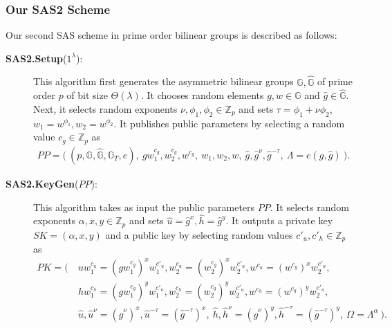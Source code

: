 \documentclass[11pt,letterpaper]{article}
\newcommand{\G}{\mathbb{G}}
\newcommand{\Z}{\mathbb{Z}}
\newcommand{\tb}[1]{\textbf{#1}}
\begin{document}
\subsubsection{Our SAS2 Scheme}

Our second SAS scheme in prime order bilinear groups is described as follows:

\begin{description}
\item [\tb{SAS2.Setup}($1^\lambda$):] This algorithm first generates the
    asymmetric bilinear groups $\G, \hat{\G}$ of prime order $p$ of bit
    size $\Theta(\lambda)$. It chooses random elements $g, w \in \G$ and
    $\hat{g} \in \hat{\G}$. Next, it selects random exponents $\nu, \phi_1,
    \phi_2 \in \Z_p$ and sets $\tau = \phi_1 + \nu \phi_2$, $w_1 =
    w^{\phi_1}, w_2 = w^{\phi_2}$. It publishes public parameters by
    selecting a random value $c_g \in \Z_p$ as
    \begin{align*}
    PP = \Big(~ (p, \G, \hat{\G}, \G_T, e),~
        g w_1^{c_g}, w_2^{c_g}, w^{c_g},~ w_1, w_2, w,~
        \hat{g}, \hat{g}^{\nu}, \hat{g}^{-\tau},~
        \Lambda = e(g, \hat{g})
    ~\Big).
    \end{align*}

\item [\tb{SAS2.KeyGen}($PP$):] This algorithm takes as input the public
    parameters $PP$. It selects random exponents $\alpha, x, y \in \Z_p$
    and sets $\hat{u} = \hat{g}^x, \hat{h} = \hat{g}^y$. It outputs a
    private key $SK = (\alpha, x, y)$ and a public key by selecting random
    values $c'_u, c'_h \in \Z_p$ as
    \begin{align*}
    PK = \Big(~
    &   u w_1^{c_u} = (g w_1^{c_g})^x w_1^{c'_u},
        w_2^{c_u}   = (w_2^{c_g})^x w_2^{c'_u},
        w^{c_u}     = (w^{c_g})^x w_2^{c'_u},~ \\
    &   h w_1^{c_h} = (g w_1^{c_g})^y w_1^{c'_u},
        w_2^{c_h}   = (w_2^{c_g})^y w_2^{c'_u},
        w^{c_h}     = (w^{c_g})^y w_2^{c'_u},~ \\
    &   \hat{u}, \hat{u}^{\nu} = (\hat{g}^{\nu})^x,
        \hat{u}^{-\tau} = (\hat{g}^{-\tau})^x,~
        \hat{h}, \hat{h}^{\nu} = (\hat{g}^{\nu})^y,
        \hat{h}^{-\tau} = (\hat{g}^{-\tau})^y,~
        \Omega = \Lambda^{\alpha}
    ~\Big).
    \end{align*}


\end{description}
\end{document}
